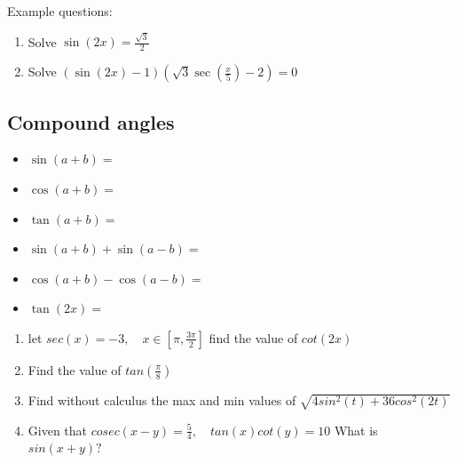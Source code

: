 \documentclass[12pt]{article}
\begin{document}
Example questions:
\begin{enumerate}
    \item Solve $\sin(2x) = \frac{\sqrt{3}}{2}$
    \item Solve $(\sin(2x) - 1)(\sqrt{3}\sec(\frac{x}{5}) - 2) = 0$
\end{enumerate}

\subsection{Compound angles}
\begin{itemize}
    \item $\sin(a+b) = $
    \item $\cos(a+b) = $
    \item $\tan(a+b) = $
    \item $\sin(a + b) + \sin(a - b) = $
    \item $\cos(a + b) - \cos(a - b) = $
    \item $\tan(2x) = $
\end{itemize}
\begin{enumerate}
    \item let $sec(x) = -3, \quad x \in [\pi ,\frac{3\pi}{2}]$ find the value of $cot(2x)$
    \item Find the value of $tan(\frac{\pi}{8})$
    \item Find without calculus the max and min values of $\sqrt{4sin^{2}(t) + 36cos^{2}(2t)}$
    \item Given that $cosec(x - y) = \frac{5}{4},\quad tan(x)cot(y) = 10$ What is $sin(x+y)?$
\end{enumerate}
\end{document}
